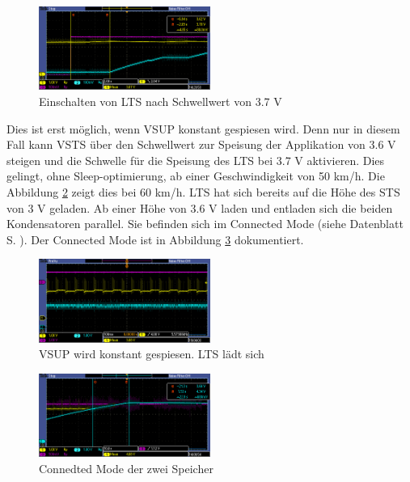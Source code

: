 \begin{figure}[ht]
   \includegraphics[width=0.5\textwidth]{4Resultate/imag/LTS_Ladeschwelle.PNG}
    \caption{Einschalten von LTS nach Schwellwert von 3.7 V}
    \label{lts_ein}
\end{figure}

Dies ist erst möglich, wenn VSUP konstant gespiesen wird. Denn nur in diesem Fall kann VSTS über den Schwellwert zur Speisung der Applikation von 3.6 V steigen und die Schwelle für die Speisung des LTS bei 3.7 V aktivieren. Dies gelingt, ohne Sleep-optimierung, ab einer Geschwindigkeit von 50 km/h. Die Abbildung \ref{vsup_konstant} zeigt dies bei 60 km/h. LTS hat sich bereits auf die Höhe des STS von 3 V geladen. Ab einer Höhe von 3.6 V laden und entladen sich die beiden Kondensatoren parallel. Sie befinden sich im Connected Mode (siehe Datenblatt S. ). Der Connected Mode ist in Abbildung \ref{connected_mode} dokumentiert.

\begin{figure}[ht]
   \includegraphics[width=0.5\textwidth]{4Resultate/imag/pic_5.PNG}
    \caption{VSUP wird konstant gespiesen. LTS lädt sich}
    \label{vsup_konstant}
\end{figure}

\begin{figure}[ht]
   \includegraphics[width=0.5\textwidth]{4Resultate/imag/STS_LTS_connect.PNG}
    \caption{Connedted Mode der zwei Speicher}
    \label{connected_mode}
\end{figure}

